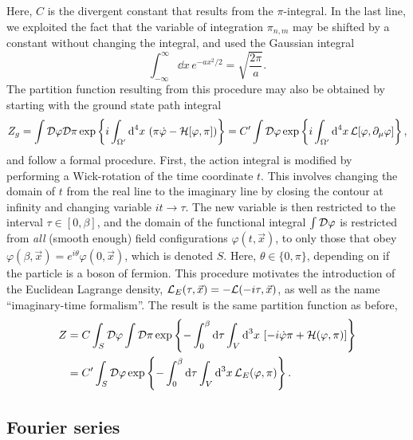 %
Here, $C$ is the divergent constant that results from the $\pi$-integral.
In the last line, we exploited the fact that the variable of integration $\pi_{n,m}$ may be shifted by a constant without changing the integral, and used the Gaussian integral
%
\begin{equation*}
    \int_{-\infty}^{\infty} \dd x \, e^{-a x^2/2} = \sqrt{\frac{2 \pi}{a}}.
\end{equation*}
%
The partition function resulting from this procedure may also be obtained by starting with the ground state path integral
%
\begin{equation*}
    Z_g
    =\int \mathcal D\varphi\mathcal D\pi\,
    \text{exp} \left\{ i \int_{\Omega'} \text{d}^4 x \, \left(\pi\dot\varphi - \mathcal{H}[\varphi, \pi]\right) \right\}
    = C' \int \mathcal D \varphi\,
    \text{exp} \left\{ i \int_{\Omega'} \text{d}^4 x \, \mathcal{L}[\varphi, \partial_\mu \varphi] \right\},
\end{equation*}
and follow a formal procedure.
First, the action integral is modified by performing a Wick-rotation of the time coordinate $t$.
This involves changing the domain of $t$ from the real line to the imaginary line by closing the contour at infinity and changing variable $it \rightarrow \tau$.
The new variable is then restricted to the interval $\tau\in [0, \beta]$, and the domain of the functional integral $\int \mathcal D \varphi$ is restricted from \emph{all} (smooth enough) field configurations $\varphi(t, \vec x)$, to only those that obey $\varphi(\beta, \vec x) = e^{i\theta} \varphi(0, \vec x) $, which is denoted $S$.
Here, $\theta \in \{0, \pi\}$, depending on if the particle is a boson of fermion.
This procedure motivates the introduction of  the Euclidean Lagrange density, 
$\mathcal{L}_E(\tau, \vec x) = -\mathcal{L}(-i \tau, \vec x)$, as well as the name ``imaginary-time formalism''.
The result is the same partition function as before,
%
\begin{align}
    Z & = C \int_S \mathcal D \varphi \int \mathcal D \pi\,
    \text{exp} \left\{ 
        - \int_0^\beta \text{d} \tau \int_V \text{d}^3x \, 
        \left[
            - i\dot \varphi \pi
            + \mathcal{H}(\varphi, \pi)
        \right]
     \right\} \nonumber \\ \label{free scalar result 2}
    & =
    C' \int_S \mathcal D \varphi\,
    \text{exp} \left\{ - \int_0^\beta \text{d} \tau \int_V \text{d}^3x \, \mathcal{L}_E(\varphi, \pi) \right\}.
\end{align}
%



\subsection{Fourier series}

